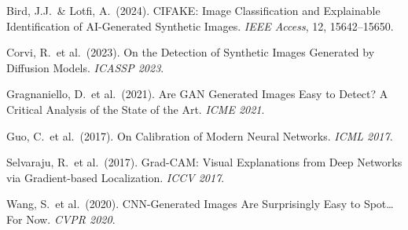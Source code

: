 \documentclass[12pt,a4paper]{article}
\begin{document}
\begin{enumerate}[label={[\arabic*]}, noitemsep]
    \item Bird, J.J.\ \& Lotfi, A.\ (2024). CIFAKE: Image Classification and Explainable Identification of AI-Generated Synthetic Images. \textit{IEEE Access}, 12, 15642--15650.
    \item Corvi, R.\ et al.\ (2023). On the Detection of Synthetic Images Generated by Diffusion Models. \textit{ICASSP 2023}.
    \item Gragnaniello, D.\ et al.\ (2021). Are GAN Generated Images Easy to Detect? A Critical Analysis of the State of the Art. \textit{ICME 2021}.
    \item Guo, C.\ et al.\ (2017). On Calibration of Modern Neural Networks. \textit{ICML 2017}.
    \item Selvaraju, R.\ et al.\ (2017). Grad-CAM: Visual Explanations from Deep Networks via Gradient-based Localization. \textit{ICCV 2017}.
    \item Wang, S.\ et al.\ (2020). CNN-Generated Images Are Surprisingly Easy to Spot\ldots For Now. \textit{CVPR 2020}.
\end{enumerate}
\end{document}
